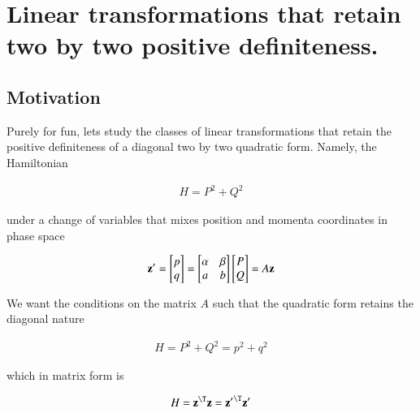 

\chapter{Linear transformations that retain two by two positive definiteness.}
\label{chap:quadraticForm}
{}
\date{Oct 4, 2009}

\beginArtWithToc

\section{Motivation}

Purely for fun, lets study the classes of linear transformations that retain the positive definiteness of a diagonal two by two quadratic form.  Namely, the Hamiltonian

\begin{align}\label{eqn:quadratricForm:voo1}
H = P^2 + Q^2
\end{align}

under a change of variables that mixes position and momenta coordinates in phase space

\begin{align}\label{eqn:quadratricForm:voo2}
\mathbf{z}' =
\begin{bmatrix}
p \\
q
\end{bmatrix}
=
\begin{bmatrix}
\alpha & \beta \\
a      & b \\
\end{bmatrix}
\begin{bmatrix}
P \\
Q
\end{bmatrix}
= A \mathbf{z}
\end{align}

We want the conditions on the matrix $A$ such that the quadratic form retains the diagonal nature

\begin{align}\label{eqn:quadratricForm:voo3a}
H = P^2 + Q^2 = p^2 + q^2
\end{align}

which in matrix form is

\begin{align}\label{eqn:quadratricForm:voo3}
H = \Bz^\T \Bz = {\Bz'}^\T \Bz' 
\end{align}

